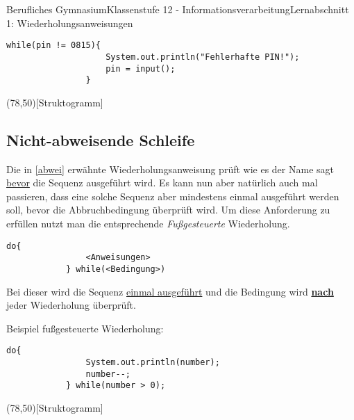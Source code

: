 \documentclass[11pt,oneside,openany,headings=optiontotoc,11pt,numbers=noenddot]{article}
\begin{document}
\begin{worksheet}{Berufliches Gymnasium}{Klassenstufe 12 - Informationsverarbeitung}{Lernabschnitt 1: Wiederholungsanweisungen}
\begin{minipage}[t]{0.48\textwidth}
\begin{lstlisting}[style=JavaInputStyle,frame=single]
				while(pin != 0815){
					System.out.println("Fehlerhafte PIN!");
					pin = input();
				}
			\end{lstlisting}
		\end{minipage}
		\hfill
		\begin{minipage}[t]{0.48\textwidth}
			\vspace*{0pt}
			\begin{struktogramm}(78,50)[Struktogramm]
				\whileend
			\end{struktogramm}
		\end{minipage}
		\subsection{Nicht-abweisende Schleife}
		Die in \ref{abwei} erwähnte Wiederholungsanweisung prüft wie es der Name sagt \underline{bevor} die Sequenz ausgeführt wird. Es kann nun aber natürlich auch mal passieren, dass eine solche Sequenz aber mindestens einmal ausgeführt werden soll, bevor die Abbruchbedingung überprüft wird. Um diese Anforderung zu erfüllen nutzt man die entsprechende \textit{Fußgesteuerte} Wiederholung.\\
		\begin{lstlisting}[style=JavaInputStyle]
			do{
				<Anweisungen>
			} while(<Bedingung>)
		\end{lstlisting}
		\par\noindent
		Bei dieser wird die Sequenz \underline{einmal ausgeführt} und die Bedingung wird \textbf{\underline{nach}} jeder Wiederholung überprüft.\\
		\par\noindent
		\begin{minipage}[t]{0.48\textwidth}
			\vspace*{0pt}
			Beispiel fußgesteuerte Wiederholung:
			\begin{lstlisting}[style=JavaInputStyle,frame=single]
			do{
				System.out.println(number);
				number--;
			} while(number > 0);
			\end{lstlisting}
		\end{minipage}
		\hfill
		\begin{minipage}[t]{0.48\textwidth}
			\vspace*{0pt}
			\begin{struktogramm}(78,50)[Struktogramm]
				\untilend
			\end{struktogramm}
		\end{minipage}
	\end{worksheet}
\end{document}
